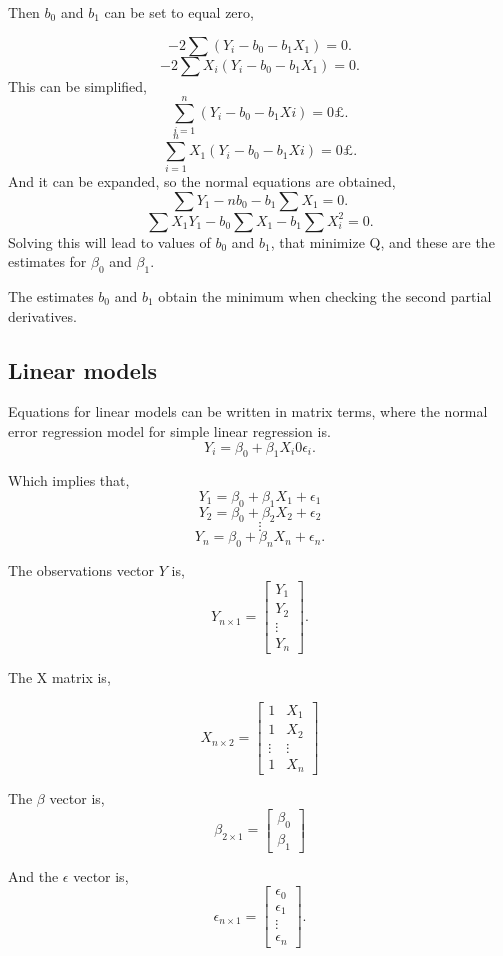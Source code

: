\noindent Then $b_0$ and $b_1$ can be set to equal zero, 

$$-2 \sum (Y_i - b_0 - b_1 X_1)=0 .$$
$$-2\sum X_i(Y_i - b_0 - b_1 X_1)=0 .$$
This can be simplified, 
$$\sum_{i=1}^{n} (Y_i - b_0 - b_1 Xi)=0£ .$$
$$\sum_{i=1}^{n} X_1(Y_i - b_0 - b_1 Xi)=0£ .$$
And it can be expanded, so the normal equations are obtained, 
$$\sum Y_1 - n b_0 - b_1 \sum X_1 =0 .$$
$$\sum X_1 Y_1  - b_0 \sum X_1 - b_1 \sum X_i^2 =0 .$$
Solving this will lead to values of $b_0$ and $b_1$, that minimize Q, and these are the estimates for $\beta_0$ and $\beta_1$. 

\noindent The estimates $b_0$ and $b_1$ obtain the minimum when checking the second partial derivatives. \newline


\subsection{Linear models}

Equations for linear models can be written in matrix terms, where the normal error regression model for simple linear regression is.
$$Y_i = \beta_0 + \beta_1 X_i 0 \epsilon_i .$$ 


\noindent Which implies that,
$$Y_1 = \beta_0 + \beta_1 X_1 + \epsilon_1$$
$$Y_2 = \beta_0 + \beta_2 X_2 + \epsilon_2$$
$$\vdots$$
$$Y_n = \beta_0 + \beta_n X_n + \epsilon_n .$$

\noindent The observations vector $Y$ is,
$$ Y_{n \times 1} =
\left[
\begin{array}{c}
	Y_1 \\ 
	Y_2 \\ 
	\vdots \\
	Y_n 
\end{array}
\right].
$$	

\noindent The X matrix is, 

$$X_{n \times 2}=
\left[
\begin{array}{cc}
	1 & X_1 \\ 
	1 & X_2 \\ 
	\vdots & \vdots \\
	1 & X_n
\end{array}
\right]
$$


\noindent The $\beta$ vector is, 
$$ \beta_{2 \times 1} =
\left[
\begin{array}{c}
	\beta_0 \\ 
	\beta_1 
\end{array}
\right]
$$

\noindent And the $\epsilon$ vector is,
$$ \epsilon_{n \times 1} =
\left[
\begin{array}{c}
	\epsilon_0 \\ 
	\epsilon_1 \\
	\vdots \\
	\epsilon_n 
\end{array}
\right].
$$

